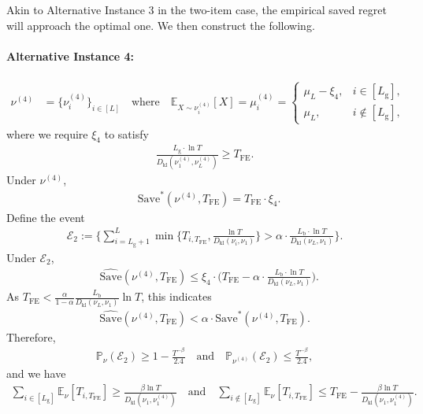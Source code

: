 \documentclass[twoside,11pt]{article}
\newcommand{\kl}{D_{\mathrm{kl}}}
\newcommand{\calE}{\mathcal{E}}
\newcommand{\rmb}{\mathrm{b}}
\newcommand{\rmg}{\mathrm{g}}
\newcommand{\bbE}{\mathbb{E}}
\newcommand{\bbP}{\mathbb{P}}
\newcommand{\Tfe}{T_{\mathrm{FE}}}
\newcommand{\Saved}{\mathrm{Save}}
\begin{document}
Akin to Alternative Instance 3 in the two-item case, the empirical saved regret will approach the optimal one. We then construct the following. 

\paragraph{Alternative Instance 4:}
\begin{align}
\nu^{(4)} 
&= \big\{ \nu_i^{(4)} \big\}_{i\in[L]} 
\quad\text{where}\quad \bbE_{X\sim \nu_i^{(4)}}[X]=
\mu_i^{(4)} =
\begin{cases}
\mu_L - \xi_4, & i\in[L_{\rmg}] , \\
\mu_L,& i\notin[L_{\rmg}],
\end{cases}
\end{align}
where we require $\xi_4$ to satisfy
\begin{align}
    \frac{L_{\rmg}\cdot\ln T}{\kl(\nu_1^{(4)},\nu_L^{(4)})}\geq \Tfe.
\end{align}
Under $\nu^{(4)}$,
\begin{align}
    &\Saved^*(\nu^{(4)},\Tfe) = \Tfe\cdot\xi_4.
\end{align}
Define the event 
\begin{align}
    \calE_2 :=\bigg\{\sum_{i=L_{\rmg}+1}^L \min\big\{T_{i,\Tfe},\frac{\ln T}{\kl(\nu_i,\nu_1)}\big\} >\alpha\cdot \frac{L_{\rmb}\cdot\ln T}{\kl(\nu_L,\nu_1)}  \bigg\}.
\end{align}
Under $\calE_2$,
\begin{align}
    &\widehat{\Saved}(\nu^{(4)},\Tfe) \leq \xi_4\cdot  \bigg(\Tfe-\alpha\cdot \frac{L_{\rmb}\cdot\ln T}{\kl(\nu_L,\nu_1)}\bigg).
\end{align}
As $\Tfe< \frac{\alpha}{1-\alpha} \frac{L_{\rmb}}{\kl(\nu_L,\nu_1)}\ln T$, this indicates 
\begin{align}
     \widehat{\Saved}(\nu^{(4)},\Tfe) <\alpha\cdot \Saved^*(\nu^{(4)},\Tfe).
\end{align}
Therefore,
\begin{align}
    \bbP_{\nu}(\calE_2)\geq 1- \frac{T^{-\beta}}{2.4}
    \quad\mbox{and}\quad
    \bbP_{\nu^{(4)}}(\calE_2)\leq \frac{T^{-\beta}}{2.4},
\end{align}
and we have 
\begin{align}
    \sum_{i\in[L_{\rmg}]}\bbE_{\nu}[T_{i,\Tfe}] \geq \frac{\beta\ln T}{\kl(\nu_1,\nu_1^{(4)})}
    \quad\mbox{and}\quad
    \sum_{i\notin[L_{\rmg}]}\bbE_{\nu}[T_{i,\Tfe}] \leq \Tfe-\frac{\beta\ln T}{\kl(\nu_1,\nu_1^{(4)})}.
\end{align}
\end{document}
